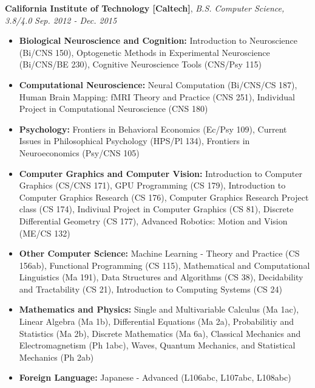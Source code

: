 \documentclass[9pt]{article}
\newenvironment{changemargin}[2]{%
  \begin{list}{}{%
    \setlength{\topsep}{0pt}%
    \setlength{\leftmargin}{#1}%
    \setlength{\rightmargin}{#2}%
    \setlength{\listparindent}{\parindent}%
    \setlength{\itemindent}{\parindent}%
    \setlength{\parsep}{\parskip}%
  }%
  \item[]}{\end{list}
}
\newenvironment{body} {
	\vspace*{-16pt}
	\begin{changemargin}{-0.25in}{-0.5in}
  }	
	{\end{changemargin}
}
\begin{document}
\begin{body}
	\vspace{18pt}
	\textbf{California Institute of Technology [Caltech]}{}, \emph{B.S. Computer Science, 3.8/4.0} \hfill \emph{Sep. 2012 - Dec. 2015}{} \\
	\begin{itemize} \itemsep -0pt
	\item \textbf{Biological Neuroscience and Cognition: } Introduction to Neuroscience (Bi/CNS 150), Optogenetic Methods in Experimental Neuroscience (Bi/CNS/BE 230), Cognitive Neuroscience Tools (CNS/Psy 115)
	\item \textbf{Computational Neuroscience: } Neural Computation (Bi/CNS/CS 187), Human Brain Mapping: fMRI Theory and Practice (CNS 251), Individual Project in Computational Neuroscience (CNS 180)
	\item \textbf{Psychology: } Frontiers in Behavioral Economics (Ec/Psy 109), Current Issues in Philosophical Psychology (HPS/Pl 134), Frontiers in Neuroeconomics (Psy/CNS 105)
	\item \textbf{Computer Graphics and Computer Vision: } Introduction to Computer Graphics (CS/CNS 171), GPU Programming (CS 179), Introduction to Computer Graphics Research (CS 176), Computer Graphics Research Project class (CS 174), Indiviual Project in Computer Graphics (CS 81), Discrete Differential Geometry (CS 177), Advanced Robotics: Motion and Vision (ME/CS 132)
	\item \textbf{Other Computer Science: } Machine Learning - Theory and Practice (CS 156ab), Functional Programming (CS 115), Mathematical and Computational Linguistics (Ma 191), Data Structures and Algorithms (CS 38), Decidability and Tractability (CS 21), Introduction to Computing Systems (CS 24)
	\item \textbf{Mathematics and Physics: } Single and Multivariable Calculus (Ma 1ac), Linear Algebra (Ma 1b), Differential Equations (Ma 2a), Probabilitiy and Statistics (Ma 2b), Discrete Mathematics (Ma 6a), Classical Mechanics and Electromagnetism (Ph 1abc), Waves, Quantum Mechanics, and Statistical Mechanics (Ph 2ab)
	\item \textbf{Foreign Language: } Japanese - Advanced (L106abc, L107abc, L108abc)
	\end{itemize}
\end{body}

\smallskip
\vspace*{3pt}
\end{document}
